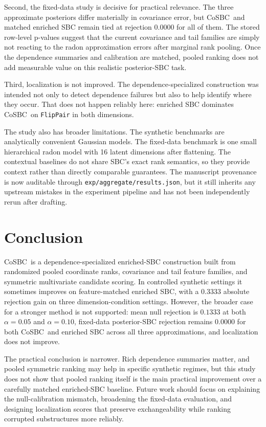 \documentclass[10pt,twocolumn]{article}
\newcommand{\method}{CoSBC}
\newcommand{\1}{\mathbf{1}}
\begin{document}
Second, the fixed-data study is decisive for practical relevance. The three approximate posteriors differ materially in covariance error, but \method\ and matched enriched SBC remain tied at rejection $0.0000$ for all of them. The stored row-level p-values suggest that the current covariance and tail families are simply not reacting to the radon approximation errors after marginal rank pooling. Once the dependence summaries and calibration are matched, pooled ranking does not add measurable value on this realistic posterior-SBC task.

Third, localization is not improved. The dependence-specialized construction was intended not only to detect dependence failures but also to help identify where they occur. That does not happen reliably here: enriched SBC dominates \method\ on \texttt{FlipPair} in both dimensions.

The study also has broader limitations. The synthetic benchmarks are analytically convenient Gaussian models. The fixed-data benchmark is one small hierarchical radon model with 16 latent dimensions after flattening. The contextual baselines do not share SBC's exact rank semantics, so they provide context rather than directly comparable guarantees. The manuscript provenance is now auditable through \texttt{exp/aggregate/results.json}, but it still inherits any upstream mistakes in the experiment pipeline and has not been independently rerun after drafting.

\section{Conclusion}
\method\ is a dependence-specialized enriched-SBC construction built from randomized pooled coordinate ranks, covariance and tail feature families, and symmetric multivariate candidate scoring. In controlled synthetic settings it sometimes improves on feature-matched enriched SBC, with a $0.3333$ absolute rejection gain on three dimension-condition settings. However, the broader case for a stronger method is not supported: mean null rejection is $0.1333$ at both $\alpha=0.05$ and $\alpha=0.10$, fixed-data posterior-SBC rejection remains $0.0000$ for both \method\ and enriched SBC across all three approximations, and localization does not improve.

The practical conclusion is narrower. Rich dependence summaries matter, and pooled symmetric ranking may help in specific synthetic regimes, but this study does not show that pooled ranking itself is the main practical improvement over a carefully matched enriched-SBC baseline. Future work should focus on explaining the null-calibration mismatch, broadening the fixed-data evaluation, and designing localization scores that preserve exchangeability while ranking corrupted substructures more reliably.
\end{document}
